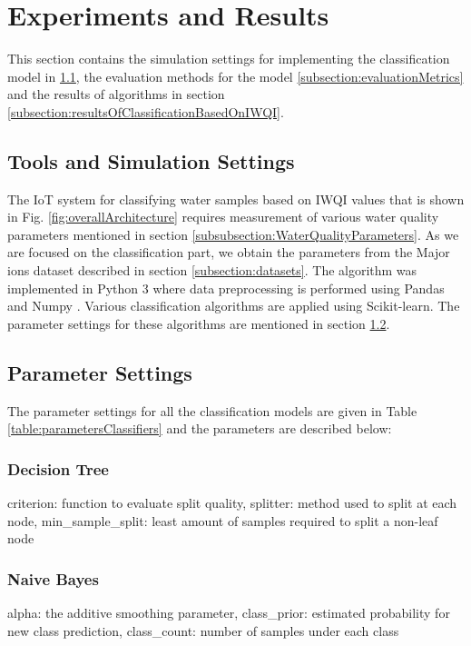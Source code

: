 \documentclass[conference]{IEEEtran}
\begin{document}
\section{Experiments and Results}
\label{section:expAndRes}
This section contains the simulation settings for implementing the classification model in \ref{subsection:toolsAndSimulationSettings}, the evaluation methods for the model  
\ref{subsection:evaluationMetrics} and the results of algorithms in section \ref{subsection:resultsOfClassificationBasedOnIWQI}.
\subsection{Tools and Simulation Settings}
\label{subsection:toolsAndSimulationSettings}
The IoT system for classifying water samples based on IWQI values that is shown in Fig. \ref{fig:overallArchitecture} requires measurement of various water quality parameters mentioned in section \ref{subsubsection:WaterQualityParameters}. As we are focused on the classification part, we obtain the parameters from the Major ions dataset described in section \ref{subsection:datasets}. The algorithm was implemented in Python 3 where data preprocessing is performed using Pandas \cite{article:pandas} and Numpy \cite{article:numpy}. Various classification algorithms are applied using Scikit-learn. The parameter settings for these algorithms are mentioned in section \ref{subsection:parameterSettings}.    


\subsection{Parameter Settings}
\label{subsection:parameterSettings}
The parameter settings for all the classification models are given in Table \ref{table:parametersClassifiers} and the parameters are described below:

\subsubsection{Decision Tree}
\label{subsubsection:decisionTree}
criterion: function to evaluate split quality, splitter: method used to split at each node, min\_sample\_split: least amount of samples required to split a non-leaf node 

\subsubsection{Naive Bayes}
\label{subsubsection:naivebayes}
alpha: the additive smoothing parameter, class\_prior: estimated probability for new class prediction, class\_count: number of samples under each class 
\end{document}
